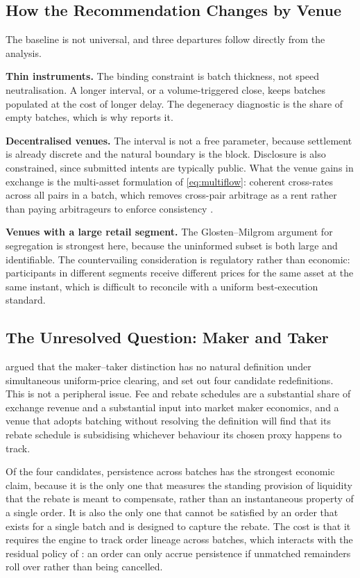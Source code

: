 \subsection{How the Recommendation Changes by Venue}

The baseline is not universal, and three departures follow directly from
the analysis.

\textbf{Thin instruments.} The binding constraint is batch thickness,
not speed neutralisation. A longer interval, or a volume-triggered
close, keeps batches populated at the cost of longer delay. The
degeneracy diagnostic is the share of empty batches, which is why
 reports it.

\textbf{Decentralised venues.} The interval is not a free parameter,
because settlement is already discrete and the natural boundary is the
block. Disclosure is also constrained, since submitted intents are
typically public. What the venue gains in exchange is the multi-asset
formulation of \eqref{eq:multiflow}: coherent cross-rates across all
pairs in a batch, which removes cross-pair arbitrage as a rent rather
than paying arbitrageurs to enforce consistency
\citep{walther2021multitoken,ramsay2023speedex}.

\textbf{Venues with a large retail segment.} The Glosten--Milgrom
argument for segregation is strongest here, because the uninformed
subset is both large and identifiable. The countervailing consideration
is regulatory rather than economic: participants in different segments
receive different prices for the same asset at the same instant, which
is difficult to reconcile with a uniform best-execution standard.

\subsection{The Unresolved Question: Maker and Taker}

 argued that the maker--taker distinction has no
natural definition under simultaneous uniform-price clearing, and set
out four candidate redefinitions. This is not a peripheral issue. Fee
and rebate schedules are a substantial share of exchange revenue and a
substantial input into market maker economics, and a venue that adopts
batching without resolving the definition will find that its rebate
schedule is subsidising whichever behaviour its chosen proxy happens to
track.

Of the four candidates, persistence across batches has the strongest
economic claim, because it is the only one that measures the standing
provision of liquidity that the rebate is meant to compensate, rather
than an instantaneous property of a single order. It is also the only
one that cannot be satisfied by an order that exists for a single batch
and is designed to capture the rebate. The cost is that it requires the
engine to track order lineage across batches, which interacts with the
residual policy of : an order can only accrue
persistence if unmatched remainders roll over rather than being
cancelled.


